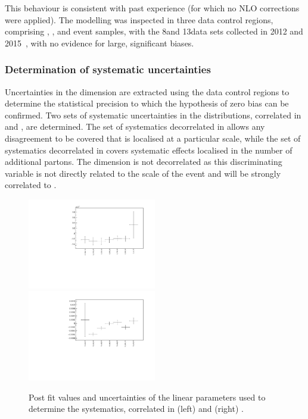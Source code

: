This behaviour is consistent with past experience (for which no NLO
corrections were applied). The \HTmiss modelling was inspected in
three data control regions, comprising \mj, \mmj, and \gj event
samples, with the 8\TeV and 13\TeV data sets collected in 2012 and
2015~\cite{Khachatryan:2016dvc}, with no evidence for large,
significant biases.

\subsubsection{Determination of systematic uncertainties}
\label{sec:mht_syst_mu}

Uncertainties in the \mht dimension are extracted using the data
control regions to determine the statistical precision to which the
hypothesis of zero bias can be confirmed. Two sets of systematic
uncertainties in the \mht distributions, correlated in \scalht and
\njet, are determined. The set of systematics decorrelated in \scalht
allows any disagreement to be covered that is localised at a
particular scale, while the set of systematics decorrelated in \njet
covers systematic effects localised in the number of additional
partons. The \nb dimension is not decorrelated as this discriminating
variable is not directly related to the scale of the event and will be
strongly correlated to \njet.

\begin{figure}[h!]
  \centering
  \includegraphics[width=0.5\textwidth]{figures/mhtTemplate/exclusive_corr_njet/Mu_graph}~
  \includegraphics[width=0.5\textwidth]{figures/mhtTemplate/exclusive_corr_ht/Mu_graph}\\
  \caption{\label{fig:postFitMu} Post fit values and uncertainties of
    the linear parameters used to determine the systematics,
    correlated in (left) \njet and (right) \scalht.}
\end{figure}

